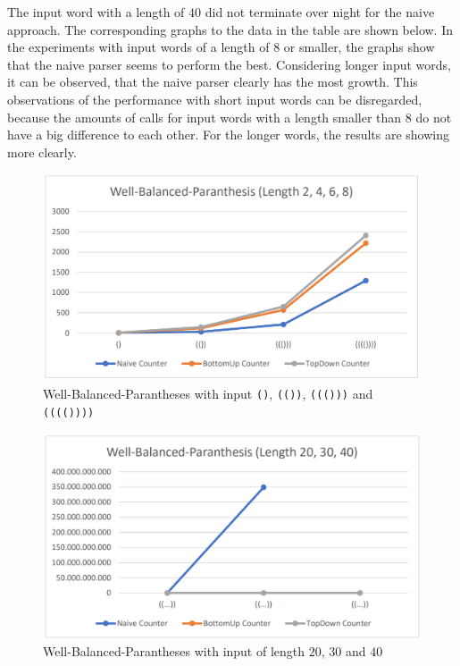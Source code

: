 \documentclass[a4paper, 11pt]{article}
\begin{document}
The input word with a length of $40$ did not terminate over night for the naive approach. The corresponding graphs to the data in the table are shown below. In the experiments with input words of a length of $8$ or smaller, the graphs show that the naive parser seems to perform the best. Considering longer input words, it can be observed, that the naive parser clearly has the most growth. This observations of the performance with short input words can be disregarded, because the amounts of calls for input words with a length smaller than $8$ do not have a big difference to each other. For the longer words, the results are showing more clearly.
\\
\begin{figure}[H]
\begin{center}
\includegraphics[scale=0.4]{diagrams/WBP_1.png}
\end{center}
\caption{Well-Balanced-Parantheses with input \texttt{()}, \texttt{(())}, \texttt{((()))} and \texttt{(((())))}}
\end{figure}

\begin{figure}[H]
\begin{center}
\includegraphics[scale=0.4]{diagrams/WBP_2.png}
\end{center}
\caption{Well-Balanced-Parantheses with input of length $20$, $30$ and $40$}
\end{figure}
\end{document}
